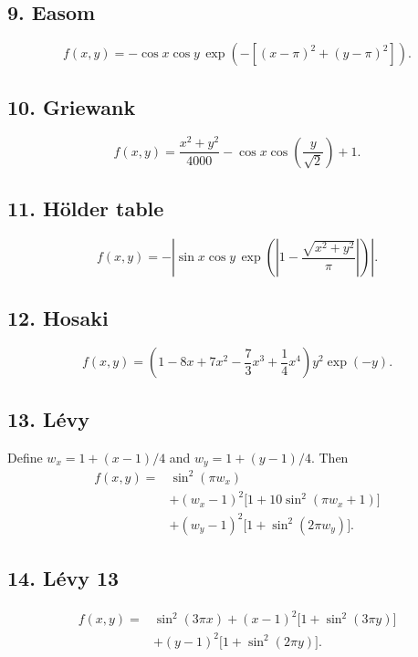 \subsection*{9. Easom}
\begin{equation}\label{eq:supp-easom}
f(x,y)=-\cos x\cos y\,\exp\!\left(-[(x-\pi)^2+(y-\pi)^2]\right).
\end{equation}

\subsection*{10. Griewank}
\begin{equation}\label{eq:supp-griewank}
f(x,y)=\frac{x^2+y^2}{4000}-\cos x\cos\!\left(\frac{y}{\sqrt{2}}\right)+1.
\end{equation}

\subsection*{11. H\"older table}
\begin{equation}\label{eq:supp-holder}
f(x,y)=-\left|\sin x\cos y\,
\exp\!\left(\left|1-\frac{\sqrt{x^2+y^2}}{\pi}\right|\right)\right|.
\end{equation}

\subsection*{12. Hosaki}
\begin{equation}\label{eq:supp-hosaki}
f(x,y)=\left(1-8x+7x^2-\frac{7}{3}x^3+\frac14x^4\right)y^2\exp(-y).
\end{equation}

\FloatBarrier %
\subsection*{13. L\'evy}
Define \(w_x=1+(x-1)/4\) and \(w_y=1+(y-1)/4\).
Then
\begin{equation}\label{eq:supp-levy}
\begin{aligned}
f(x,y)={}&\sin^2(\pi w_x)\\
&+(w_x-1)^2\bigl[1+10\sin^2(\pi w_x+1)\bigr]\\
&+(w_y-1)^2\bigl[1+\sin^2(2\pi w_y)\bigr].
\end{aligned}
\end{equation}

\subsection*{14. L\'evy 13}
\begin{equation}\label{eq:supp-levy13}
\begin{aligned}
f(x,y)={}&\sin^2(3\pi x)+(x-1)^2\bigl[1+\sin^2(3\pi y)\bigr]\\
&+(y-1)^2\bigl[1+\sin^2(2\pi y)\bigr].
\end{aligned}
\end{equation}

